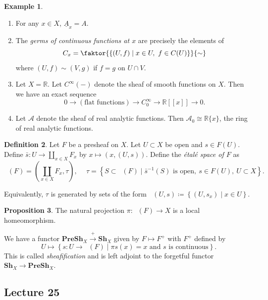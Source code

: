 \documentclass[10pt,letterpaper,cm]{nupset}
\theoremstyle{definition}
\newtheorem{definition}{Definition}[subsection]
\newtheorem{exmp}[definition]{Example}
\theoremstyle{theorem}
\newtheorem{prop}[definition]{Proposition}
\theoremstyle{remark}
\newcommand{\R}{\mathbb{R}}
\newcommand{\1}{\mathbb{1}}
\newcommand{\0}{\vec 0}
\DeclareMathOperator{\Et}{\acute{E}t}
\begin{document}
\begin{exmp} $ $
\begin{enumerate}
\item For any $x \in X$, $\underline{A}_x =A$.
\item The \textit{germs of continuous functions at $x$} are precisely the elements of $$C_x = \faktor{  \left\{\left(U, f\right) \mid x\in U, \ f \in C(U)\right\}    }{\sim}$$ where $\left(U, f\right) \sim \left(V, g\right)$ if $f =g$ on $U \cap V$.
\item Let $X = \R$. Let $C^{\infty}({-})$ denote the sheaf of smooth functions on $X$. Then we have an exact sequence 
\[
0 \longrightarrow \left(\text{flat functions}\right) \longrightarrow C_0^{\infty} \longrightarrow \R[\![x]\!] \longrightarrow 0   .
\]
\item Let $\mathcal{A}$ denote the sheaf of real analytic functions. Then $\mathcal{A}_0 \cong \R\{x\}$, the ring of real analytic functions.
\end{enumerate}
\end{exmp}

\begin{definition}
Let $F$ be a presheaf on $X$. Let $U \subset X$ be open and $s \in F(U)$. Define $\bar{s} : U \to  \coprod_{x\in X} F_x$ by $x \mapsto \left(x, \left(U, s\right)\right)$. Define the \textit{\'etal\'e space of $F$} as $$\Et(F)   =  \left(\coprod_{x\in X} F_x, \tau \right), \ \quad \tau =\left\{S \subset \Et(F) \mid \bar{s}^{-1}(S) \text{ is open}, \ s \in F(U), \ U\subset X \right\}.    $$ 
\end{definition}

Equivalently, $\tau$ is generated by sets of the form $\Et(U, s) \coloneqq  \left\{\left(U, s_x\right) \mid x \in U\right\}$.

\begin{prop}
The natural projection $\pi : \Et(F) \to X$ is a local homeomorphism. 
\end{prop}

\smallskip

We have a functor $\mathbf{PreSh}_X \overset{+}{\longrightarrow} \mathbf{Sh}_{X}$ given by $F \mapsto F^{+}$ with $F^{+}$ defined by $$U \mapsto \left\{s : U \to \Et(F) \mid \pi s(x) = x \text{ and } s \text{ is continuous}\right\}  .$$ This is called \textit{sheafification} and is left adjoint to the forgetful functor $\mathbf{Sh}_{X} \to \mathbf{PreSh}_X$.


\subsection{Lecture 25}
\end{document}
